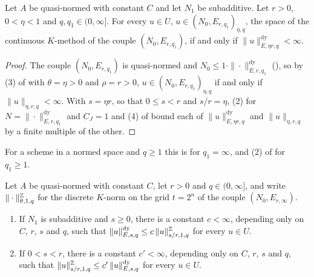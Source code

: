 \begin{theorem}
\label{thm:e-spaces-interpolate}
\leanok
{}
Let $A$ be quasi-normed with constant $C$ and let $N_1$ be subadditive. Let $r > 0$,
$0 < \eta < 1$ and $q, q_1 \in (0, \infty]$. For every $u \in U$,
$u \in (N_0, E_{r, q_1})_{\eta, q}$, the space of the continuous $K$-method of the couple
$(N_0, E_{r, q_1})$, if and only if $\|u\|^{\mathrm{dy}}_{E, \eta r, q} < \infty$.
\end{theorem}

\begin{proof}
\leanok
{}
The couple $(N_0, E_{r, q_1})$ is quasi-normed and
$N_0 \leq 1 \cdot \|\cdot\|^{\mathrm{dy}}_{E, r, q_1}$ (), so by (3) of
 with $\theta = \eta > 0$ and $\rho = r > 0$,
$u \in (N_0, E_{r, q_1})_{\eta, q}$ if and only if $\|u\|_{\eta, r, q} < \infty$. With
$s = \eta r$, so that $0 \leq s < r$ and $s / r = \eta$,  (2) for
$N = \|\cdot\|^{\mathrm{dy}}_{E, r, q_1}$ and $C_J = 1$ and (4) of 
bound each of $\|u\|^{\mathrm{dy}}_{E, \eta r, q}$ and $\|u\|_{\eta, r, q}$ by a finite multiple
of the other.
\end{proof}

For a scheme in a normed space and $q \geq 1$ this is
 for $q_1 = \infty$, and (2) of
 for $q_1 \geq 1$.

\begin{lemma}
\label{lem:e-couple-norms}
\leanok
{}
Let $A$ be quasi-normed with constant $C$, let $r > 0$ and $q \in (0, \infty]$, and write
$\|\cdot\|^{\mathbb{Z}}_{\theta, 1, q}$ for the discrete $K$-norm on the grid $t = 2^n$ of the couple
$(N_0, E_{r, \infty})$.
\begin{enumerate}
  \item If $N_1$ is subadditive and $s \geq 0$, there is a constant $c < \infty$, depending only
    on $C$, $r$, $s$ and $q$, such that
    $\|u\|^{\mathrm{dy}}_{E, s, q} \leq c \, \|u\|^{\mathbb{Z}}_{s/r, 1, q}$ for every $u \in U$.
  \item If $0 < s < r$, there is a constant $c' < \infty$, depending only on $C$, $r$, $s$ and
    $q$, such that $\|u\|^{\mathbb{Z}}_{s/r, 1, q} \leq c' \, \|u\|^{\mathrm{dy}}_{E, s, q}$ for every
    $u \in U$.
\end{enumerate}
\end{lemma}

